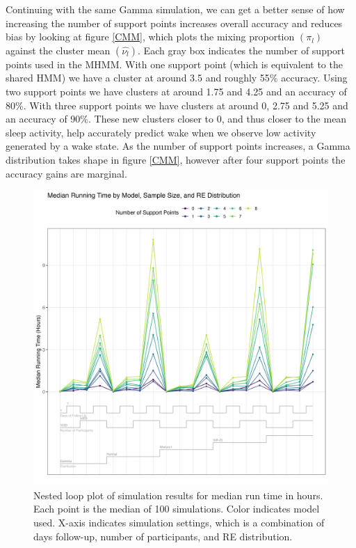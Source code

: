 \documentclass{article}
\begin{document}
Continuing with the same Gamma simulation, we can get a better sense of how increasing the number of support points increases overall accuracy and reduces bias by looking at figure \ref{CMM}, which plots the mixing proportion $(\pi_l)$ against the cluster mean $(\hat{\nu_l})$. Each gray box indicates the number of support points used in the MHMM. With one support point (which is equivalent to the shared HMM) we have a cluster at around 3.5 and roughly 55\% accuracy. Using two support points we have clusters at around 1.75 and 4.25 and an accuracy of 80\%. With three support points we have clusters at around 0, 2.75 and 5.25 and an accuracy of 90\%. These new clusters closer to 0, and thus closer to the mean sleep activity, help accurately predict wake when we observe low activity generated by a wake state. As the number of support points increases, a Gamma distribution takes shape in figure \ref{CMM}, however after four support points the accuracy gains are marginal.

\begin{figure}
\includegraphics[scale=.55]{Support/NestedLoopCompTime.png}
\centering
\caption{Nested loop plot of simulation results for median run time in hours. Each point is the median of 100 simulations. Color indicates model used. X-axis indicates simulation settings, which is a combination of days follow-up, number of participants, and RE distribution.}
\label{time}
\end{figure}
\end{document}

